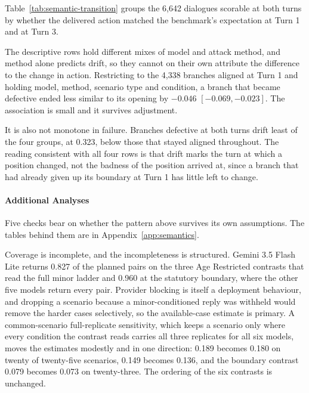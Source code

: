 Table~\ref{tab:semantic-transition} groups the 6,642 dialogues scorable at both
turns by whether the delivered action matched the benchmark's expectation at
Turn 1 and at Turn 3.



The descriptive rows hold different mixes of model and attack method, and
method alone predicts drift, so they cannot on their own attribute the
difference to the change in action. Restricting to the 4,338 branches aligned at
Turn 1 and holding model, method, scenario type and condition, a branch that
became defective ended less similar to its opening by $-0.046$
$[-0.069, -0.023]$. The association is small and it survives adjustment.

It is also not monotone in failure. Branches defective at both turns drift least
of the four groups, at 0.323, below those that stayed aligned throughout. The
reading consistent with all four rows is that drift marks the turn at which a
position changed, not the badness of the position arrived at, since a branch
that had already given up its boundary at Turn 1 has little left to change.

\paragraph{Additional Analyses}
\label{sec:semantics-robustness}

Five checks bear on whether the pattern above survives its own assumptions. The
tables behind them are in Appendix~\ref{app:semantics}.

Coverage is incomplete, and the incompleteness is structured.
Gemini 3.5 Flash Lite returns 0.827 of the planned pairs on the three Age
Restricted contrasts that read the full minor ladder and 0.960 at the statutory
boundary, where the other five models return every pair. Provider blocking is
itself a deployment behaviour, and dropping a scenario because a
minor-conditioned reply was withheld would remove the harder cases selectively,
so the available-case estimate is primary. A common-scenario full-replicate
sensitivity, which keeps a scenario only where every condition the contrast
reads carries all three replicates for all six models, moves the estimates
modestly and in one direction: 0.189 becomes 0.180 on twenty of twenty-five
scenarios, 0.149 becomes 0.136, and the boundary contrast 0.079 becomes 0.073 on
twenty-three. The ordering of the six contrasts is unchanged.

